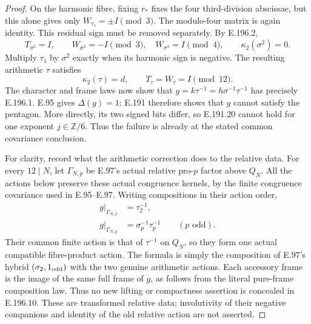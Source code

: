\begin{proof}
On the harmonic fibre, fixing \(r_*\) fixes
the four third-division abscissae, but this
alone gives only \(W_{\tau_1}=\pm I\pmod3\).
The modulo-four matrix is again identity.
This residual sign must be removed separately.
By E.196.2,
\[
              T_{\sigma^2}=I,\qquad
              W_{\sigma^2}=-I\pmod3,\quad
              W_{\sigma^2}=I\pmod4,
              \qquad\kappa_2(\sigma^2)=0 .
\tag{E.196.8}
\]
Multiply \(\tau_1\) by \(\sigma^2\) exactly
when its harmonic sign is negative.  The
resulting arithmetic \(\tau\) satisfies
\[
             \kappa_2(\tau)=d,\qquad
                       T_\tau=W_\tau=I\pmod{12}.
\tag{E.196.9}
\]
The character and frame laws now show that
\(g=k\tau^{-1}=h\sigma^{-1}\tau^{-1}\)
has precisely E.196.1.
E.95 gives \(\Delta(g)=1\); E.191 therefore
shows that \(g\) cannot satisfy the pentagon.
More directly, its two signed bits differ,
so E.191.20 cannot hold for one exponent
\(j\in\mathbb Z/6\).  Thus the failure is
already at the stated common covariance
conclusion.

For clarity, record what the arithmetic
correction does to the relative data.
For every \(12\mid N\), let
\(\Gamma_{N,p}\) be E.97's actual relative
pro-\(p\) factor above \(Q_N\).
All the actions below preserve these
actual congruence kernels, by the finite
congruence covariance used in E.95--E.97.
Writing compositions in their action order,
\[
 \begin{split}
  g|_{\Gamma_{N,2}}&=\tau_2^{-1},\\
  g|_{\Gamma_{N,p}}&=\sigma_p^{-1}\tau_p^{-1}
                              \qquad(p\text{ odd}).
 \end{split}
\tag{E.196.10}
\]
Their common finite action is that of
\(\tau^{-1}\) on \(Q_N\), so they form one
actual compatible fibre-product action.
The formula is simply the composition
of E.97's hybrid \((\sigma_2,1_{\rm odd})\)
with the two genuine arithmetic actions.
Each accessory frame is the image of the
same full frame of \(g\), as follows from
the literal pure-frame composition law.
Thus no new lifting or compactness assertion
is concealed in E.196.10.  These are
transformed relative data; involutivity of
their negative companions and identity of
the old relative action are not asserted.
\end{proof}
